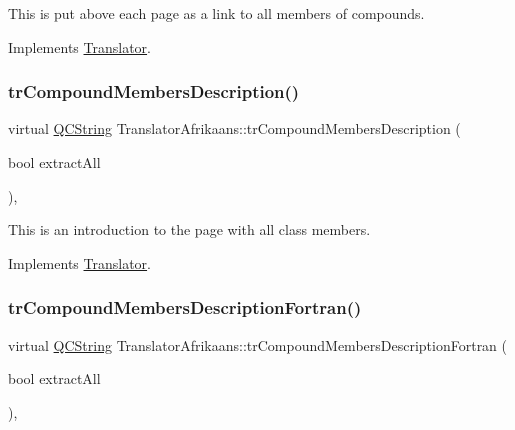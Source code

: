 This is put above each page as a link to all members of compounds. 

Implements \mbox{\hyperlink{class_translator}{Translator}}.

\mbox{\label{class_translator_afrikaans_ae88551834343233829ed7eb9beeef154}} 
\subsubsection{\texorpdfstring{trCompoundMembersDescription()}{trCompoundMembersDescription()}}
{\footnotesize\ttfamily virtual \mbox{\hyperlink{class_q_c_string}{Q\+C\+String}} Translator\+Afrikaans\+::tr\+Compound\+Members\+Description (\begin{DoxyParamCaption}\item[{bool}]{extract\+All }\end{DoxyParamCaption})\hspace{0.3cm}{\ttfamily [inline]}, {\ttfamily [virtual]}}

This is an introduction to the page with all class members. 

Implements \mbox{\hyperlink{class_translator}{Translator}}.

\mbox{\label{class_translator_afrikaans_a7064480c315ef4fcde71a5ff46497d15}} 
\subsubsection{\texorpdfstring{trCompoundMembersDescriptionFortran()}{trCompoundMembersDescriptionFortran()}}
{\footnotesize\ttfamily virtual \mbox{\hyperlink{class_q_c_string}{Q\+C\+String}} Translator\+Afrikaans\+::tr\+Compound\+Members\+Description\+Fortran (\begin{DoxyParamCaption}\item[{bool}]{extract\+All }\end{DoxyParamCaption})\hspace{0.3cm}{\ttfamily [inline]}, {\ttfamily [virtual]}}

